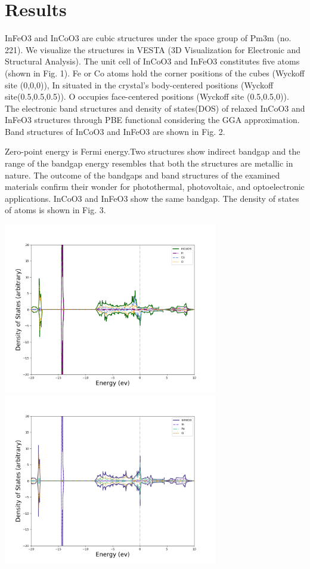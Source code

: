 \documentclass[12pt, letterpaper]{article}
\newcommand*{\1}{\hspace{1pt}}
\begin{document}
    \section{Results}
    InFeO3 and InCoO3 are cubic structures under the space group of Pm3m (no. 221). We visualize the structures in VESTA (3D Visualization for Electronic and 
    Structural Analysis). The unit cell of InCoO3 and InFeO3 constitutes five atoms (shown in Fig. 1). Fe or Co atoms hold the corner positions of the cubes (Wyckoff 
    site (0,0,0)), In situated in the crystal's body-centered positions (Wyckoff site(0.5,0.5,0.5)). O occupies face-centered positions (Wyckoff site (0.5,0.5,0)). 
    The electronic band structures and density of states(DOS) of relaxed InCoO3 and InFeO3 structures through PBE functional considering the GGA approximation. 
    Band structures of InCoO3 and InFeO3 are shown in Fig. 2.  


    
    Zero-point energy is Fermi energy.Two structures show indirect bandgap and the range of the bandgap 
    energy resembles that both the structures are metallic in nature. The outcome of the bandgaps and band structures of the examined materials confirm their wonder
    for photothermal, photovoltaic, and optoelectronic applications. InCoO3 and InFeO3 show the same bandgap. The density of states of atoms is shown in Fig. 3.
    
    \begin{adjustbox}{center,caption={Density of States Of InCoO3 and InFeO3},label={somelabel},nofloat=figure,vspace=\bigskipamount,}
        \includegraphics[width=0.7\textwidth]{DosInCoO3}
        \includegraphics[width=0.7\textwidth]{DosInFeO3}
    \end{adjustbox}
    
\end{document}
